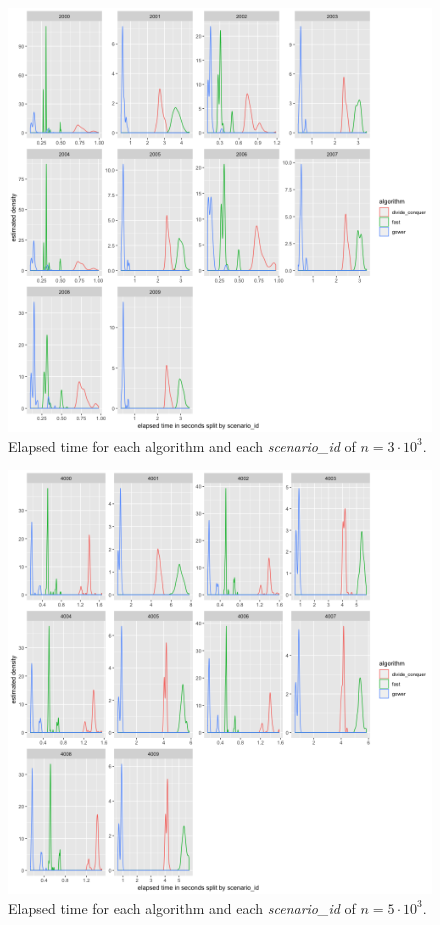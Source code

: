 \documentclass[11pt]{report}
\begin{document}
\begin{figure}[!ht]
\centering
    \includegraphics{./images/elapsed_time_3000.png}
    \caption{Elapsed time for each algorithm and each \textit{scenario\_id} of $n=3 \cdot 10^3$.}
    \label{elapsed_time_3000}
\end{figure}


\begin{figure}[!ht]
\centering
    \includegraphics{./images/elapsed_time_5000.png}
    \caption{Elapsed time for each algorithm and each \textit{scenario\_id} of $n=5 \cdot 10^3$.}
    \label{elapsed_time_5000}
\end{figure}
\end{document}
